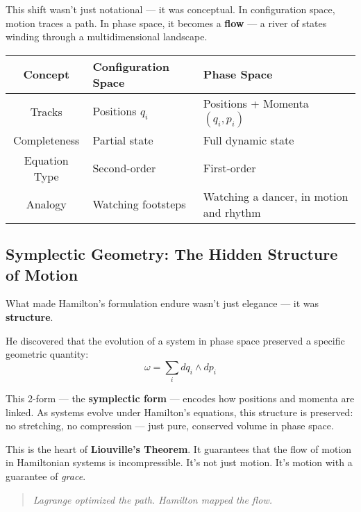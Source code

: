 This shift wasn’t just notational — it was conceptual. In configuration space, motion traces a path.  
In phase space, it becomes a \textbf{flow} — a river of states winding through a multidimensional landscape.

\begin{center}
\begin{tabularx}{\textwidth}{|c|X|X|}
\hline
\textbf{Concept} & \textbf{Configuration Space} & \textbf{Phase Space} \\
\hline
Tracks & Positions \( q_i \) & Positions + Momenta \( (q_i, p_i) \) \\
\hline
Completeness & Partial state & Full dynamic state \\
\hline
Equation Type & Second-order & First-order \\
\hline
Analogy & Watching footsteps & Watching a dancer, in motion and rhythm \\
\hline
\end{tabularx}
\end{center}

\subsection{Symplectic Geometry: The Hidden Structure of Motion}

What made Hamilton’s formulation endure wasn’t just elegance — it was \textbf{structure}.

He discovered that the evolution of a system in phase space preserved a specific geometric quantity:
\[
\omega = \sum_i dq_i \wedge dp_i
\]

This 2-form — the \textbf{symplectic form} — encodes how positions and momenta are linked.  
As systems evolve under Hamilton’s equations, this structure is preserved:  
no stretching, no compression — just pure, conserved volume in phase space.

This is the heart of \textbf{Liouville’s Theorem}. It guarantees that the flow of motion in Hamiltonian systems is incompressible.  
It’s not just motion. It’s motion with a guarantee of \textit{grace}.

\begin{quote}
    \textit{Lagrange optimized the path.  
    Hamilton mapped the flow.}
\end{quote}
